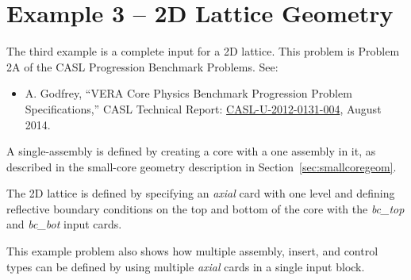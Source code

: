 \documentclass{report}
\numberwithin{equation}{section}
\begin{document}


\section{Example 3 -- 2D Lattice Geometry}
The third example is a complete input for a 2D lattice.
This problem is Problem 2A of the CASL Progression Benchmark Problems. See:
\begin{itemize}
\item A. Godfrey, ``VERA Core Physics Benchmark Progression Problem Specifications,''                                      
CASL Technical Report: \href{http://www.casl.gov/docs/CASL-U-2012-0131-004.pdf}{CASL-U-2012-0131-004}, August 2014.
\end{itemize}


A single-assembly is defined by creating a core with a one assembly in it,
as described in the small-core geometry description in Section~\ref{sec:smallcoregeom}.

The 2D lattice is defined by specifying an {\it axial} card with one level and defining 
reflective boundary conditions on the top and bottom of the core with the {\it bc\_top} and {\it bc\_bot}
input cards.

This example problem also shows how multiple assembly, insert, and control types can be
defined by using multiple {\it axial} cards in a single input block.



\end{document}
